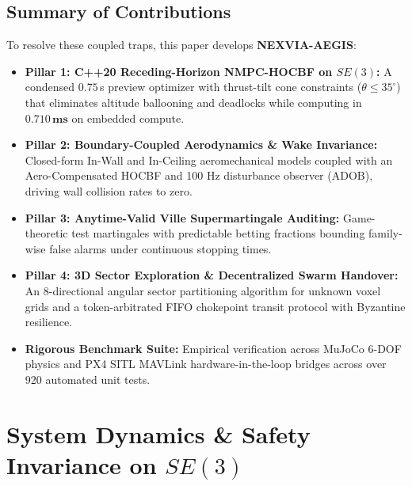 \documentclass[journal,10pt]{IEEEtran}
\begin{document}
\subsection{Summary of Contributions}
To resolve these coupled traps, this paper develops \textbf{NEXVIA-AEGIS}:
\begin{itemize}[leftmargin=12pt]
    \item \textbf{Pillar 1: C++20 Receding-Horizon NMPC-HOCBF on $SE(3)$:} A condensed $0.75\,$s preview optimizer with thrust-tilt cone constraints ($\theta \le 35^\circ$) that eliminates altitude ballooning and deadlocks while computing in $\mathbf{0.710\,\text{ms}}$ on embedded compute.
    \item \textbf{Pillar 2: Boundary-Coupled Aerodynamics \& Wake Invariance:} Closed-form In-Wall and In-Ceiling aeromechanical models coupled with an Aero-Compensated HOCBF and 100 Hz disturbance observer (ADOB), driving wall collision rates to zero.
    \item \textbf{Pillar 3: Anytime-Valid Ville Supermartingale Auditing:} Game-theoretic test martingales with predictable betting fractions bounding family-wise false alarms under continuous stopping times.
    \item \textbf{Pillar 4: 3D Sector Exploration \& Decentralized Swarm Handover:} An 8-directional angular sector partitioning algorithm for unknown voxel grids and a token-arbitrated FIFO chokepoint transit protocol with Byzantine resilience.
    \item \textbf{Rigorous Benchmark Suite:} Empirical verification across MuJoCo 6-DOF physics and PX4 SITL MAVLink hardware-in-the-loop bridges across over 920 automated unit tests.
\end{itemize}

\section{System Dynamics \& Safety Invariance on \texorpdfstring{$SE(3)$}{SE(3)}}
\label{sec:system_modeling}
\end{document}

